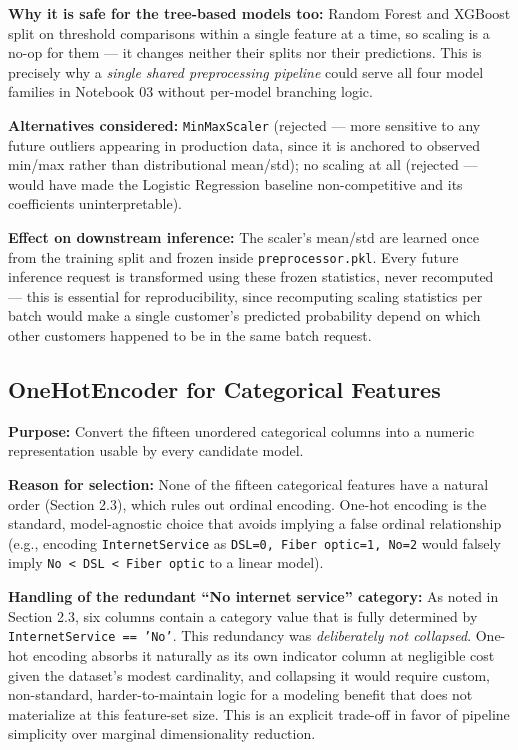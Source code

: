 \documentclass[11pt]{article}
\newcommand{\artifact}[1]{\texttt{\color{navy}#1}}
\begin{document}
\textbf{Why it is safe for the tree-based models too:} Random Forest and XGBoost split on threshold comparisons within a single feature at a time, so scaling is a no-op for them --- it changes neither their splits nor their predictions. This is precisely why a \emph{single shared preprocessing pipeline} could serve all four model families in Notebook 03 without per-model branching logic.

\textbf{Alternatives considered:} \texttt{MinMaxScaler} (rejected --- more sensitive to any future outliers appearing in production data, since it is anchored to observed min/max rather than distributional mean/std); no scaling at all (rejected --- would have made the Logistic Regression baseline non-competitive and its coefficients uninterpretable).

\textbf{Effect on downstream inference:} The scaler's mean/std are learned once from the training split and frozen inside \artifact{preprocessor.pkl}. Every future inference request is transformed using these frozen statistics, never recomputed --- this is essential for reproducibility, since recomputing scaling statistics per batch would make a single customer's predicted probability depend on which other customers happened to be in the same batch request.

\subsection{OneHotEncoder for Categorical Features}
\label{sec:onehot}

\textbf{Purpose:} Convert the fifteen unordered categorical columns into a numeric representation usable by every candidate model.

\textbf{Reason for selection:} None of the fifteen categorical features have a natural order (Section 2.3), which rules out ordinal encoding. One-hot encoding is the standard, model-agnostic choice that avoids implying a false ordinal relationship (e.g., encoding \artifact{InternetService} as \texttt{DSL=0, Fiber optic=1, No=2} would falsely imply \texttt{No < DSL < Fiber optic} to a linear model).

\textbf{Handling of the redundant ``No internet service'' category:} As noted in Section 2.3, six columns contain a category value that is fully determined by \artifact{InternetService == 'No'}. This redundancy was \emph{deliberately not collapsed}. One-hot encoding absorbs it naturally as its own indicator column at negligible cost given the dataset's modest cardinality, and collapsing it would require custom, non-standard, harder-to-maintain logic for a modeling benefit that does not materialize at this feature-set size. This is an explicit trade-off in favor of pipeline simplicity over marginal dimensionality reduction.
\end{document}
